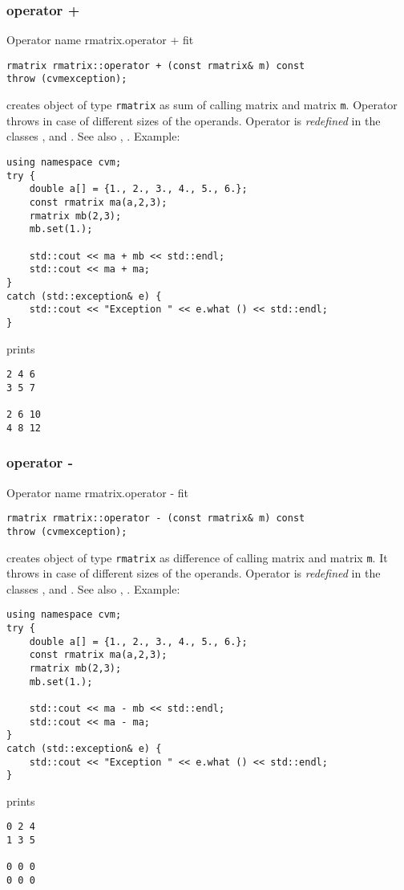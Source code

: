 \subsubsection{operator +}
Operator%
\pdfdest name {rmatrix.operator +} fit
\begin{verbatim}
rmatrix rmatrix::operator + (const rmatrix& m) const
throw (cvmexception);
\end{verbatim}
creates  object of type \verb"rmatrix" as  sum of
 calling matrix and  matrix \verb"m".
Operator throws  
in case of different sizes of the operands.
Operator is \emph{redefined} in the classes
, 
and .
See also , .
Example:
\begin{Verbatim}
using namespace cvm;
try {
    double a[] = {1., 2., 3., 4., 5., 6.};
    const rmatrix ma(a,2,3);
    rmatrix mb(2,3);
    mb.set(1.);

    std::cout << ma + mb << std::endl;
    std::cout << ma + ma;
}
catch (std::exception& e) {
    std::cout << "Exception " << e.what () << std::endl;
}
\end{Verbatim}
prints
\begin{Verbatim}
2 4 6
3 5 7

2 6 10
4 8 12
\end{Verbatim}
\newpage




\subsubsection{operator -}
Operator%
\pdfdest name {rmatrix.operator -} fit
\begin{verbatim}
rmatrix rmatrix::operator - (const rmatrix& m) const
throw (cvmexception);
\end{verbatim}
creates  object of type \verb"rmatrix" as  difference of
 calling matrix and  matrix \verb"m".
It throws  
in case of different sizes of the operands.
Operator is \emph{redefined} in the classes
, 
and .
See also , .
Example:
\begin{Verbatim}
using namespace cvm;
try {
    double a[] = {1., 2., 3., 4., 5., 6.};
    const rmatrix ma(a,2,3);
    rmatrix mb(2,3);
    mb.set(1.);

    std::cout << ma - mb << std::endl;
    std::cout << ma - ma;
}
catch (std::exception& e) {
    std::cout << "Exception " << e.what () << std::endl;
}
\end{Verbatim}
prints
\begin{Verbatim}
0 2 4
1 3 5

0 0 0
0 0 0
\end{Verbatim}
\newpage




